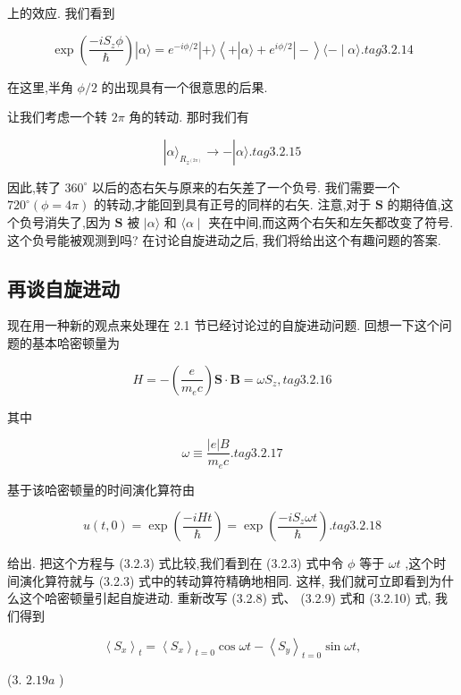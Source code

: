 上的效应. 我们看到

$$
\exp \left( \frac{-i{S}_{z}\phi }{\hslash }\right) \left| {\alpha \rangle = {e}^{-{i\phi }/2}}\right| + \rangle \left\langle {+\left| {\alpha \rangle + {e}^{{i\phi }/2}}\right| - }\right\rangle \langle - \mid \alpha \rangle . tag{3.2.14}
$$

在这里,半角 $\phi /2$ 的出现具有一个很意思的后果.

让我们考虑一个转 ${2\pi }$ 角的转动. 那时我们有

$$
\left| {\alpha {\rangle }_{{R}_{{z}^{\left( 2\pi \right) }}} \rightarrow - }\right| \alpha \rangle \text{.} tag{3. 2.15}
$$

因此,转了 ${360}^{ \circ }$ 以后的态右矢与原来的右矢差了一个负号. 我们需要一个 ${720}^{ \circ }\left( {\phi = {4\pi }}\right)$ 的转动,才能回到具有正号的同样的右矢. 注意,对于 $\mathbf{S}$ 的期待值,这个负号消失了,因为 $\mathbf{S}$ 被 $|\alpha \rangle$ 和 $\langle \alpha \mid$ 夹在中间,而这两个右矢和左矢都改变了符号. 这个负号能被观测到吗? 在讨论自旋进动之后, 我们将给出这个有趣问题的答案.

\subsection{再谈自旋进动} 

现在用一种新的观点来处理在 2.1 节已经讨论过的自旋进动问题. 回想一下这个问题的基本哈密顿量为

$$
H = - \left( \frac{e}{{m}_{e}c}\right) \mathbf{S} \cdot \mathbf{B} = \omega {S}_{z}, tag{3.2.16}
$$

其中

$$
\omega \equiv \frac{\left| e\right| B}{{m}_{e}c}. tag{3.2.17}
$$

基于该哈密顿量的时间演化算符由

$$
u\left( {t,0}\right) = \exp \left( \frac{-{iHt}}{\hslash }\right) = \exp \left( \frac{-i{S}_{z}{\omega t}}{\hslash }\right) . tag{3. 2.18}
$$

给出. 把这个方程与 (3.2.3) 式比较,我们看到在 (3.2.3) 式中令 $\phi$ 等于 ${\omega t}$ ,这个时间演化算符就与 (3.2.3) 式中的转动算符精确地相同. 这样, 我们就可立即看到为什么这个哈密顿量引起自旋进动. 重新改写 (3.2.8) 式、 (3.2.9) 式和 (3.2.10) 式, 我们得到

$$
{\left\langle {S}_{x}\right\rangle }_{t} = {\left\langle {S}_{x}\right\rangle }_{t = 0}\cos {\omega t} - {\left\langle {S}_{y}\right\rangle }_{t = 0}\sin {\omega t},
$$

(3. ${2.19a}$ )

